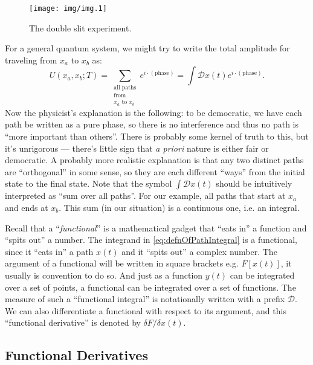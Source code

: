 \begin{figure}[t]
\texttt{[image: img/img.1]}
\caption{The double slit experiment.}\label{fig:doubleSlit}
\end{figure}

For a general quantum system, we might try to write the total
amplitude for traveling from $x_a$ to $x_b$ as:
\begin{equation}\label{eq:defnOfPathIntegral}
U(x_a,x_b;T) = \sum_{\substack{
\text{all paths}\\
\text{from}\\
\text{$x_a$ to $x_b$}
}} e^{i\cdot(\text{phase})}
= \int\mathcal{D}x(t) e^{i\cdot(\text{phase})}.
\end{equation}
Now the physicist's explanation is the following: to be
democratic, we have each path be written as a pure phase, so
there is no interference and thus no path is ``more important
than others''. There is probably some kernel of truth to this,
but it's unrigorous --- there's little sign that \emph{a priori}
nature is either fair or democratic. A probably more realistic
explanation is that any two distinct paths are ``orthogonal'' in
some sense, so they are each different ``ways'' from the initial
state to the final state. Note that the symbol $\int\mathcal{D}x(t)$
should be intuitively interpreted as ``sum over all paths''. For
our example, all paths that start at $x_a$ and ends at
$x_b$. This sum (in our situation) is a continuous one, i.e. an
integral.

Recall that a ``\emph{functional}'' is a mathematical gadget that
``eats in'' a function and ``spits out'' a number. The integrand
in \eqref{eq:defnOfPathIntegral} is a functional, since it ``eats
in'' a path $x(t)$ and it ``spits out'' a complex number. The
argument of a functional will be written in square brackets
e.g. $F[x(t)]$, it usually is convention to do so. And just as a
function $y(t)$ can be integrated over a set of points, a
functional can be integrated  over a set of functions. The
measure of such a ``functional integral'' is notationally written
with a prefix $\mathcal{D}$. We can also differentiate a
functional with respect to its argument, and this ``functional
derivative'' is denoted by $\delta F/\delta x(t)$. 

\subsection{Functional Derivatives} 

